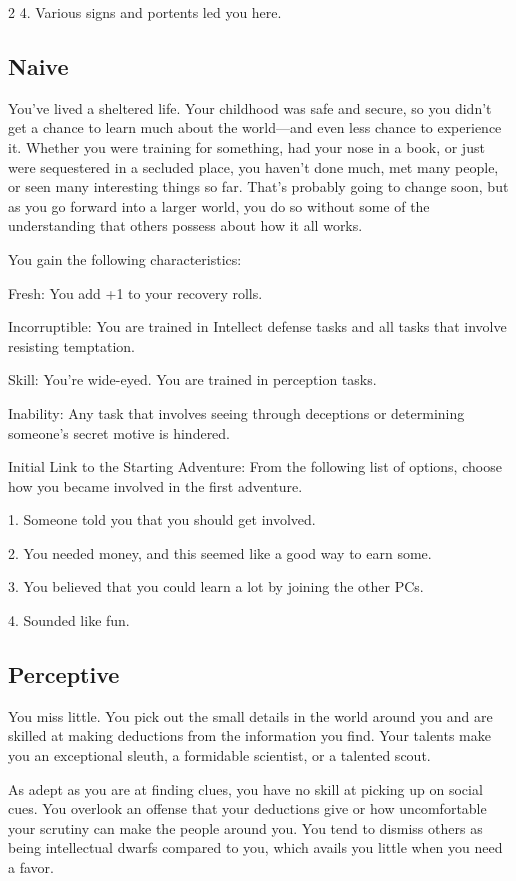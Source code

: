 \begin{multicols}{2}
4. Various signs and portents led you here.

\subsection{Naive}

You’ve lived a sheltered life. Your childhood was safe and secure, so you didn’t get a chance to learn much about the world—and even less chance to experience it. Whether you were training for something, had your nose in a book, or just were sequestered in a secluded place, you haven’t done much, met many people, or seen many interesting things so far. That’s probably going to change soon, but as you go forward into a larger world, you do so without some of the understanding that others possess about how it all works.

You gain the following characteristics:

Fresh: You add +1 to your recovery rolls.

Incorruptible: You are trained in Intellect defense tasks and all tasks that involve resisting temptation.

Skill: You’re wide-eyed. You are trained in perception tasks.

Inability: Any task that involves seeing through deceptions or determining someone’s secret motive is hindered.

Initial Link to the Starting Adventure: From the following list of options, choose how you became involved in the first adventure.

1. Someone told you that you should get involved.

2. You needed money, and this seemed like a good way to earn some.

3. You believed that you could learn a lot by joining the other PCs.

4. Sounded like fun.

\subsection{Perceptive}

You miss little. You pick out the small details in the world around you and are skilled at making deductions from the information you find. Your talents make you an exceptional sleuth, a formidable scientist, or a talented scout.

As adept as you are at finding clues, you have no skill at picking up on social cues. You overlook an offense that your deductions give or how uncomfortable your scrutiny can make the people around you. You tend to dismiss others as being intellectual dwarfs compared to you, which avails you little when you need a favor.


\end{multicols}
